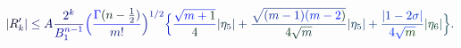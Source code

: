 \documentclass[12pt]{article}
\begin{document}
\makeatletter
\renewcommand*{\@textcolor}[3]{%
  \protect\leavevmode
  \begingroup
    \color#1{#2}#3%
  \endgroup
}
\makeatother
\begin{displaymath}
\mathcolor[RGB]{0,0,15}{|} \mathcolor[RGB]{0,0,30}{R} _ { \mathcolor[RGB]{0,0,45}{k} } ^ { \mathcolor[RGB]{0,0,60}{\prime} } \mathcolor[RGB]{0,0,75}{|} \mathcolor[RGB]{0,0,90}{\le
A} \mathcolor[RGB]{0,0,105}{\frac { \mathcolor[RGB]{0,0,120}{2} ^ { \mathcolor[RGB]{0,0,135}{k} } } { \mathcolor[RGB]{0,0,150}{B} _ { \mathcolor[RGB]{0,0,165}{1} } ^ { \mathcolor[RGB]{0,0,180}{n} \mathcolor[RGB]{0,0,195}{-} \mathcolor[RGB]{0,0,210}{1} } } } \mathcolor[RGB]{0,0,225}{\Bigl(} \mathcolor[RGB]{0,0,240}{\frac { \mathcolor[RGB]{0,0,255}{\Gamma} \mathcolor[RGB]{0,15,0}{(} \mathcolor[RGB]{0,15,15}{n} \mathcolor[RGB]{0,15,30}{-} \mathcolor[RGB]{0,15,45}{\frac { \mathcolor[RGB]{0,15,60}{1} } { \mathcolor[RGB]{0,15,75}{2} } } \mathcolor[RGB]{0,15,90}{)} } { \mathcolor[RGB]{0,15,105}{m} \mathcolor[RGB]{0,15,120}{!} } } \mathcolor[RGB]{0,15,135}{\Bigr)} ^ { \mathcolor[RGB]{0,15,150}{1} \mathcolor[RGB]{0,15,165}{/} \mathcolor[RGB]{0,15,180}{2} } \mathcolor[RGB]{0,15,195}{\Bigl\{} \mathcolor[RGB]{0,15,210}{\frac { \mathcolor[RGB]{0,15,225}{\sqrt { \mathcolor[RGB]{0,15,240}{m} \mathcolor[RGB]{0,15,255}{+} \mathcolor[RGB]{0,30,0}{1} } } } { \mathcolor[RGB]{0,30,15}{4} } } \mathcolor[RGB]{0,30,30}{|} \mathcolor[RGB]{0,30,45}{\eta} _ { \mathcolor[RGB]{0,30,60}{5} } \mathcolor[RGB]{0,30,75}{|} \mathcolor[RGB]{0,30,90}{+} \mathcolor[RGB]{0,30,105}{\frac { \mathcolor[RGB]{0,30,120}{\sqrt { \mathcolor[RGB]{0,30,135}{(} \mathcolor[RGB]{0,30,150}{m} \mathcolor[RGB]{0,30,165}{-} \mathcolor[RGB]{0,30,180}{1} \mathcolor[RGB]{0,30,195}{)} \mathcolor[RGB]{0,30,210}{(} \mathcolor[RGB]{0,30,225}{m} \mathcolor[RGB]{0,30,240}{-} \mathcolor[RGB]{0,30,255}{2} \mathcolor[RGB]{0,45,0}{)} } } } { \mathcolor[RGB]{0,45,15}{4} \mathcolor[RGB]{0,45,30}{\sqrt { \mathcolor[RGB]{0,45,45}{m} } } } } \mathcolor[RGB]{0,45,60}{|} \mathcolor[RGB]{0,45,75}{\eta} _ { \mathcolor[RGB]{0,45,90}{5} } \mathcolor[RGB]{0,45,105}{|} \mathcolor[RGB]{0,45,120}{+} \mathcolor[RGB]{0,45,135}{\frac { \mathcolor[RGB]{0,45,150}{|} \mathcolor[RGB]{0,45,165}{1} \mathcolor[RGB]{0,45,180}{-} \mathcolor[RGB]{0,45,195}{2} \mathcolor[RGB]{0,45,210}{\sigma} \mathcolor[RGB]{0,45,225}{|} } { \mathcolor[RGB]{0,45,240}{4} \mathcolor[RGB]{0,45,255}{\sqrt { \mathcolor[RGB]{0,60,0}{m} } } } } \mathcolor[RGB]{0,60,15}{|} \mathcolor[RGB]{0,60,30}{\eta} _ { \mathcolor[RGB]{0,60,45}{6} } \mathcolor[RGB]{0,60,60}{|} \mathcolor[RGB]{0,60,75}{\Bigr\}} \mathcolor[RGB]{0,60,90}{.}
\end{displaymath}
\end{document}
